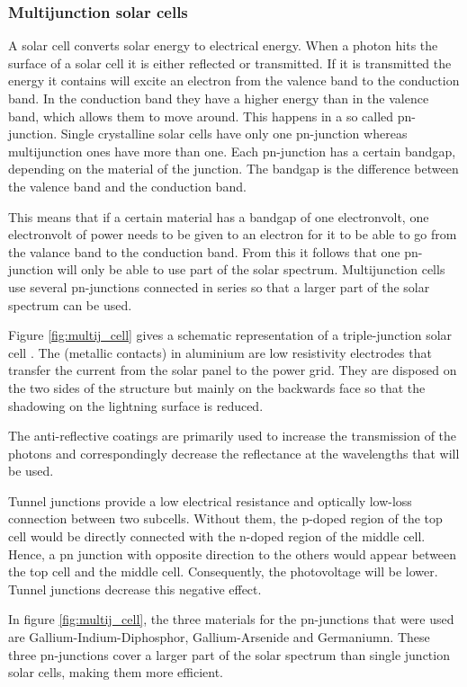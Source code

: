 \subsubsection{Multijunction solar cells}
A solar cell converts solar energy to electrical energy. When a photon hits the surface of a solar cell it is either reflected or transmitted.
If it is transmitted the energy it contains will excite an electron from the valence band to the conduction band. In the conduction band they have a higher energy than in the valence band, which allows them to move around. This happens in a so called pn-junction. Single crystalline solar cells have only one pn-junction whereas multijunction ones have more than one. Each pn-junction has a certain bandgap, depending on the material of the junction. The bandgap is the difference between the valence band and the conduction band.

This means that if a certain material has a bandgap of one electronvolt, one electronvolt of power needs to be given to an electron for it to be able to go from the valance band to the conduction band. From this it follows that one pn-junction will only be able to use part of the solar spectrum. Multijunction cells use several pn-junctions connected in series so that a larger part of the solar spectrum can be used.

Figure \ref{fig:multij_cell} gives a schematic representation of a triple-junction solar cell \cite{spectrolab}. The (metallic contacts) in aluminium are low resistivity electrodes that transfer the current from the solar panel to the power grid. They are disposed on the two sides of the structure but mainly on the backwards face so that the shadowing on the lightning surface is reduced.

The anti-reflective coatings are primarily used to increase the transmission of the photons and correspondingly decrease the reflectance at the wavelengths that will be used.

Tunnel junctions provide a low electrical resistance and optically low-loss connection between two subcells. Without them, the p-doped region of the top cell would be directly connected with the n-doped region of the middle cell. Hence, a pn junction with opposite direction to the others would appear between the top cell and the middle cell. Consequently, the photovoltage will be lower. Tunnel junctions decrease this negative effect.

In figure \ref{fig:multij_cell}, the three materials for the pn-junctions that were used are Gallium-Indium-Diphosphor, Gallium-Arsenide and Germaniumn. These three pn-junctions cover a larger part of the solar spectrum than single junction solar cells, making them more efficient.

